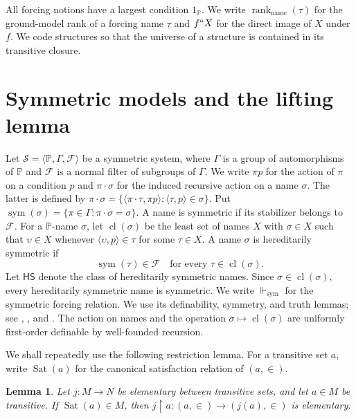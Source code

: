 \documentclass[11pt,a4paper]{amsart}
\newcommand{\HS}{\mathsf{HS}}
\newcommand{\sym}{\operatorname{sym}}
\newcommand{\namerank}{\operatorname{rank}_{\mathrm{name}}}
\newcommand{\forcesS}{\Vdash_{\mathrm{sym}}}
\newcommand{\restr}{\mathbin{\upharpoonright}}
\theoremstyle{plain}
\newtheorem{lemma}[theorem]{Lemma}
\theoremstyle{definition}
\theoremstyle{remark}
\begin{document}
All forcing notions have a largest condition $1_{\mathbb P}$.  We write $\namerank(\tau)$ for the ground-model rank of a forcing name $\tau$ and $f``X$ for the direct image of $X$ under $f$.  We code structures so that the universe of a structure is contained in its transitive closure.

\section{Symmetric models and the lifting lemma}

Let $\mathscr S=\langle\mathbb P,\Gamma,\mathcal F\rangle$ be a symmetric system, where $\Gamma$ is a group of automorphisms of $\mathbb P$ and $\mathcal F$ is a normal filter of subgroups of $\Gamma$.  We write $\pi p$ for the action of $\pi$ on a condition $p$ and $\pi\cdot\sigma$ for the induced recursive action on a name $\sigma$.  The latter is defined by
$\pi\cdot\sigma=\{\langle\pi\cdot\tau,\pi p\rangle:\langle\tau,p\rangle\in\sigma\}$.  Put $\sym(\sigma)=\{\pi\in\Gamma:\pi\cdot\sigma=\sigma\}$.  A name is symmetric if its stabilizer belongs to $\mathcal F$.  For a $\mathbb P$-name $\sigma$, let $\operatorname{cl}(\sigma)$ be the least set of names $X$ with $\sigma\in X$ such that $\upsilon\in X$ whenever $\langle\upsilon,p\rangle\in\tau$ for some $\tau\in X$.  A name $\sigma$ is hereditarily symmetric if
\begin{equation}\label{eq:HS-characterization}
\sym(\tau)\in\mathcal F\quad\text{for every }\tau\in\operatorname{cl}(\sigma).
\end{equation}
Let $\HS$ denote the class of hereditarily symmetric names.  Since $\sigma\in\operatorname{cl}(\sigma)$, every hereditarily symmetric name is symmetric.  We write $\forcesS$ for the symmetric forcing relation.  We use its definability, symmetry, and truth lemmas; see \cite[Chapter~5]{Jech}, \cite[Section~2]{Karagila}, and {\cite[Lemma~2.2 and Theorem~2.5]{HayutKaragilaSmall}}.  The action on names and the operation $\sigma\mapsto\operatorname{cl}(\sigma)$ are uniformly first-order definable by well-founded recursion.

We shall repeatedly use the following restriction lemma.  For a transitive set $a$, write $\operatorname{Sat}(a)$ for the canonical satisfaction relation of $(a,\in)$.

\begin{lemma}\label{lem:restriction-elementarity}
Let $j:M\to N$ be elementary between transitive sets, and let $a\in M$ be transitive.  If $\operatorname{Sat}(a)\in M$, then $j\restr a:(a,\in)\longrightarrow(j(a),\in)$ is elementary.
\end{lemma}
\end{document}
